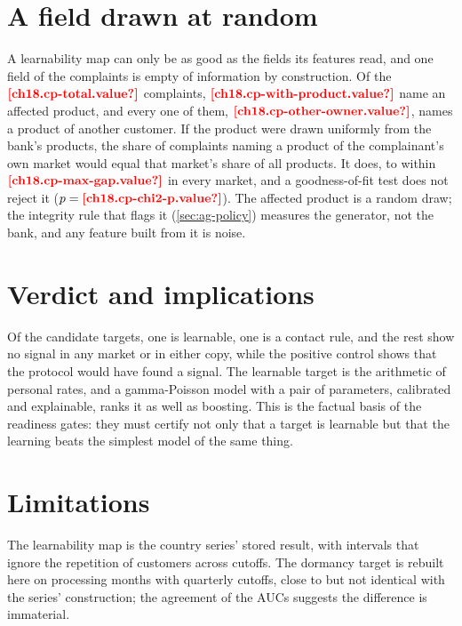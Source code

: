 

\section{A field drawn at random}\label{sec:le-random}

A learnability map can only be as good as the fields its features read, and one field of the complaints is empty of information
by construction. Of the $\est{ch18.cp-total}{value}$ complaints, $\est{ch18.cp-with-product}{value}$ name an affected product,
and every one of them, $\est{ch18.cp-other-owner}{value}$, names a product of another customer. If the product were drawn
uniformly from the bank's products, the share of complaints naming a product of the complainant's own market would equal that
market's share of all products. It does, to within $\est{ch18.cp-max-gap}{value}$ in every market, and a goodness-of-fit test
does not reject it ($p = \est{ch18.cp-chi2-p}{value}$). The affected product is a random draw; the integrity rule that flags it
(\cref{sec:ag-policy}) measures the generator, not the bank, and any feature built from it is noise.

\section{Verdict and implications}\label{sec:le-verdict}

Of the candidate targets, one is learnable, one is a contact rule, and the rest show no signal in any market or in either copy,
while the positive control shows that the protocol would have found a signal. The learnable target is the arithmetic of personal
rates, and a gamma-Poisson model with a pair of parameters, calibrated and explainable, ranks it as well as boosting. This is the factual basis
of the readiness gates: they must certify not only that a target is learnable but that the learning beats the simplest model of
the same thing.

\section{Limitations}\label{sec:le-limits}

The learnability map is the country series' stored result, with intervals that ignore the repetition of customers across cutoffs.
The dormancy target is rebuilt here on processing months with quarterly cutoffs, close to but not identical with the series'
construction; the agreement of the AUCs suggests the difference is immaterial.
